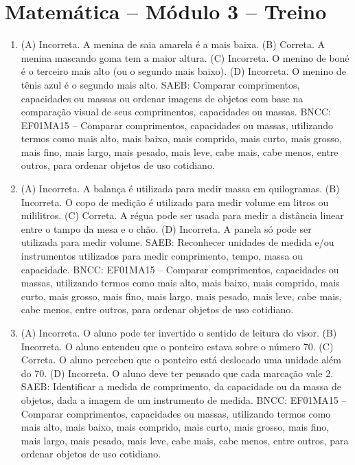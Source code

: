 \section*{Matemática – Módulo 3 – Treino}

\begin{enumerate}
\item
(A) Incorreta. A menina de saia amarela é a mais baixa.
(B) Correta. A menina mascando goma tem a maior altura.
(C) Incorreta. O menino de boné é o terceiro mais alto (ou o segundo mais
baixo).
(D) Incorreta. O menino de tênis azul é o segundo mais alto.
SAEB: Comparar comprimentos, capacidades ou massas ou ordenar
imagens de objetos com base na comparação visual de seus comprimentos,
capacidades ou massas.
BNCC: EF01MA15 -- Comparar comprimentos, capacidades ou massas,
utilizando termos como mais alto, mais baixo, mais comprido, mais curto,
mais grosso, mais fino, mais largo, mais pesado, mais leve, cabe mais,
cabe menos, entre outros, para ordenar objetos de uso cotidiano.

\item
(A) Incorreta. A balança é utilizada para medir massa em quilogramas.
(B) Incorreta. O copo de medição é utilizado para medir volume em litros ou mililitros.
(C) Correta. A régua pode ser usada para medir a distância linear entre o tampo da mesa e o chão.
(D) Incorreta. A panela só pode ser utilizada para medir volume.
SAEB: Reconhecer unidades de medida e/ou instrumentos utilizados
para medir comprimento, tempo, massa ou capacidade.
BNCC: EF01MA15 -- Comparar comprimentos, capacidades ou massas,
utilizando termos como mais alto, mais baixo, mais comprido, mais curto,
mais grosso, mais fino, mais largo, mais pesado, mais leve, cabe mais,
cabe menos, entre outros, para ordenar objetos de uso cotidiano.

\item
(A) Incorreta. O aluno pode ter invertido o sentido de leitura do visor.
(B) Incorreta. O aluno entendeu que o ponteiro estava sobre o número 70.
(C) Correta. O aluno percebeu que o ponteiro está deslocado uma unidade
além do 70.
(D) Incorreta. O aluno deve ter pensado que cada marcação vale 2.
SAEB: Identificar a medida de comprimento, da capacidade ou da
massa de objetos, dada a imagem de um instrumento de medida.
BNCC: EF01MA15 -- Comparar comprimentos, capacidades ou massas,
utilizando termos como mais alto, mais baixo, mais comprido, mais curto,
mais grosso, mais fino, mais largo, mais pesado, mais leve, cabe mais,
cabe menos, entre outros, para ordenar objetos de uso cotidiano.
\end{enumerate}

